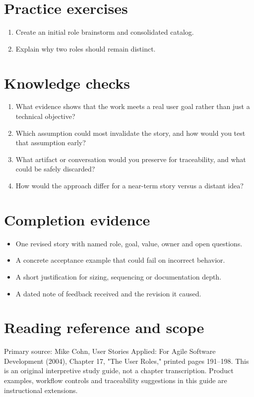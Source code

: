 \documentclass[11pt,letterpaper]{article}
\begin{document}
\section{Practice exercises}
\begin{enumerate}[leftmargin=*,itemsep=3pt]
\item Create an initial role brainstorm and consolidated catalog.
\item Explain why two roles should remain distinct.
\end{enumerate}
\section{Knowledge checks}
\begin{enumerate}[leftmargin=*,itemsep=3pt]
\item What evidence shows that the work meets a real user goal rather than just a technical objective?
\item Which assumption could most invalidate the story, and how would you test that assumption early?
\item What artifact or conversation would you preserve for traceability, and what could be safely discarded?
\item How would the approach differ for a near-term story versus a distant idea?
\end{enumerate}
\section{Completion evidence}
\begin{itemize}[leftmargin=*,itemsep=2pt]
\item One revised story with named role, goal, value, owner and open questions.
\item A concrete acceptance example that could fail on incorrect behavior.
\item A short justification for sizing, sequencing or documentation depth.
\item A dated note of feedback received and the revision it caused.
\end{itemize}
\section{Reading reference and scope}
Primary source: Mike Cohn, User Stories Applied: For Agile Software Development (2004), Chapter 17, "The User Roles," printed pages 191–198. This is an original interpretive study guide, not a chapter transcription. Product examples, workflow controls and traceability suggestions in this guide are instructional extensions.
\end{document}
